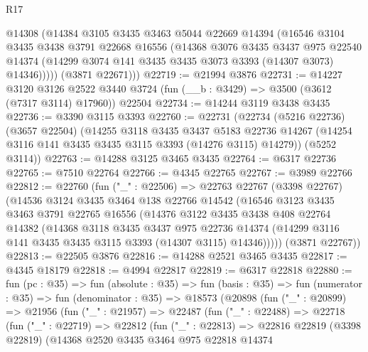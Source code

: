 \begin{lexlean}{R17}
\begin{coremodule}
          @14308
          (@14384
            @3105
            @3435
            @3463
            @5044
            @22669
            @14394
            (@16546
              @3104
              @3435
              @3438
              @3791
              @22668
              @16556
              (@14368
                @3076
                @3435
                @3437
                @975
                @22540
                @14374
                (@14299 @3074 @141 @3435 @3435 @3073 @3393 (@14307 @3073) @14346)))))
        (@3871 @22671)))
@22719 := @21994 @3876
@22731 := @14227
    @3120
    @3126
    @2522
    @3440
    @3724
    (fun (__b : @3429) => @3500 (@3612 (@7317 @3114) @17960))
    @22504
@22734 := @14244 @3119 @3438 @3435
@22736 := @3390 @3115 @3393
@22760 := @22731
    (@22734
      (@5216 @22736)
      (@3657 @22504)
      (@14255
        @3118
        @3435
        @3437
        @5183
        @22736
        @14267
        (@14254 @3116 @141 @3435 @3435 @3115 @3393 (@14276 @3115) @14279))
      (@5252 @3114))
@22763 := @14288 @3125 @3465 @3435
@22764 := @6317 @22736
@22765 := @7510 @22764
@22766 := @4345 @22765
@22767 := @3989 @22766
@22812 := @22760
    (fun ("_" : @22506) =>
    @22763
      @22767
      (@3398 @22767)
      (@14536
        @3124
        @3435
        @3464
        @138
        @22766
        @14542
        (@16546
          @3123
          @3435
          @3463
          @3791
          @22765
          @16556
          (@14376
            @3122
            @3435
            @3438
            @408
            @22764
            @14382
            (@14368
              @3118
              @3435
              @3437
              @975
              @22736
              @14374
              (@14299 @3116 @141 @3435 @3435 @3115 @3393 (@14307 @3115) @14346)))))
      (@3871 @22767))
@22813 := @22505 @3876
@22816 := @14288 @2521 @3465 @3435
@22817 := @4345 @18179
@22818 := @4994 @22817
@22819 := @6317 @22818
@22880 := fun (pc : @35) =>
  fun (absolute : @35) =>
  fun (basis : @35) =>
  fun (numerator : @35) =>
  fun (denominator : @35) =>
  @18573
    (@20898
      (fun ("_" : @20899) =>
      @21956
        (fun ("_" : @21957) =>
        @22487
          (fun ("_" : @22488) =>
          @22718
            (fun ("_" : @22719) =>
            @22812
              (fun ("_" : @22813) =>
              @22816
                @22819
                (@3398 @22819)
                (@14368
                  @2520
                  @3435
                  @3464
                  @975
                  @22818
                  @14374

\end{coremodule}
\end{lexlean}
